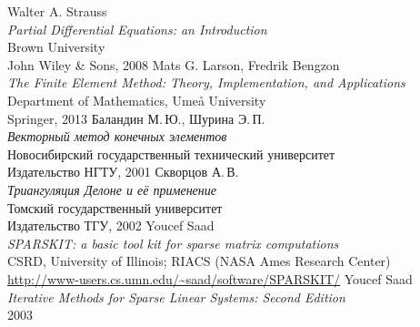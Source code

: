 \begin{thebibliography}{99}
 Walter A. Strauss\\
	\textit{Partial Differential Equations: an Introduction}\\
	Brown University\\
	John Wiley \& Sons, 2008
 Mats G. Larson, Fredrik Bengzon\\
    \textit{The Finite Element Method: Theory, Implementation, and Applications}\\
    Department of Mathematics, Umeå University\\
    Springer, 2013
 Баландин М.\,Ю., Шурина Э.\,П.\\
	\textit{Векторный метод конечных элементов}\\
	Новосибирский государственный технический университет\\
	Издательство НГТУ, 2001
 Скворцов А.\,В.\\
	\textit{Триангуляция Делоне и её применение}\\
	Томский государственный университет\\
	Издательство ТГУ, 2002
 Youcef Saad\\
	\textit{SPARSKIT: a basic tool kit for sparse matrix computations}\\
	CSRD, University of Illinois; RIACS (NASA Ames Research
	Center)\\
	\url{http://www-users.cs.umn.edu/~saad/software/SPARSKIT/}
 Youcef Saad\\
	\textit{Iterative Methods for Sparse Linear Systems: Second Edition}\\
	2003
\end{thebibliography} 